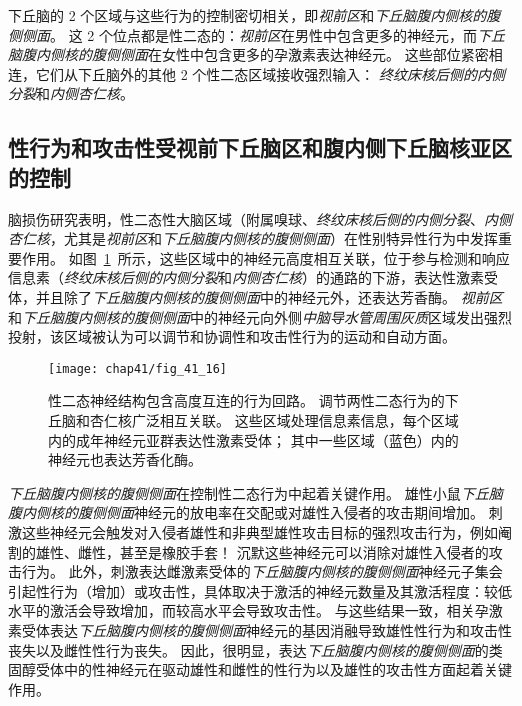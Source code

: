 下丘脑的 2 个区域与这些行为的控制密切相关，即\textit{视前区}和\textit{下丘脑腹内侧核的腹侧侧面}。
这 2 个位点都是性二态的：\textit{视前区}在男性中包含更多的神经元，而\textit{下丘脑腹内侧核的腹侧侧面}在女性中包含更多的孕激素表达神经元。
这些部位紧密相连，它们从下丘脑外的其他 2 个性二态区域接收强烈输入：
\textit{终纹床核后侧的内侧分裂}和\textit{内侧杏仁核}。



\subsection{性行为和攻击性受视前下丘脑区和腹内侧下丘脑核亚区的控制}

脑损伤研究表明，性二态性大脑区域（附属嗅球、\textit{终纹床核后侧的内侧分裂}、\textit{内侧杏仁核}，尤其是\textit{视前区}和\textit{下丘脑腹内侧核的腹侧侧面}）在性别特异性行为中发挥重要作用。
如图~\ref{fig:41_16}~所示，这些区域中的神经元高度相互关联，位于参与检测和响应信息素（\textit{终纹床核后侧的内侧分裂}和\textit{内侧杏仁核}）的通路的下游，表达性激素受体，并且除了\textit{下丘脑腹内侧核的腹侧侧面}中的神经元外，还表达芳香酶。
\textit{视前区}和\textit{下丘脑腹内侧核的腹侧侧面}中的神经元向外侧\textit{中脑导水管周围灰质}区域发出强烈投射，该区域被认为可以调节和协调性和攻击性行为的运动和自动方面。


\begin{figure}[htbp]
	\centering
	\texttt{[image: chap41/fig\_41\_16]}
	\caption{性二态神经结构包含高度互连的行为回路。
		调节两性二态行为的下丘脑和杏仁核广泛相互关联。
		这些区域处理信息素信息，每个区域内的成年神经元亚群表达性激素受体；
		其中一些区域（蓝色）内的神经元也表达芳香化酶。}
	\label{fig:41_16}
\end{figure}


\textit{下丘脑腹内侧核的腹侧侧面}在控制性二态行为中起着关键作用。
雄性小鼠\textit{下丘脑腹内侧核的腹侧侧面}神经元的放电率在交配或对雄性入侵者的攻击期间增加。
刺激这些神经元会触发对入侵者雄性和非典型雄性攻击目标的强烈攻击行为，例如阉割的雄性、雌性，甚至是橡胶手套！
沉默这些神经元可以消除对雄性入侵者的攻击行为。
此外，刺激表达雌激素受体的\textit{下丘脑腹内侧核的腹侧侧面}神经元子集会引起性行为（增加）或攻击性，具体取决于激活的神经元数量及其激活程度：较低水平的激活会导致增加，而较高水平会导致攻击性。
与这些结果一致，相关孕激素受体表达\textit{下丘脑腹内侧核的腹侧侧面}神经元的基因消融导致雄性性行为和攻击性丧失以及雌性性行为丧失。
因此，很明显，表达\textit{下丘脑腹内侧核的腹侧侧面}的类固醇受体中的性神经元在驱动雄性和雌性的性行为以及雄性的攻击性方面起着关键作用。




